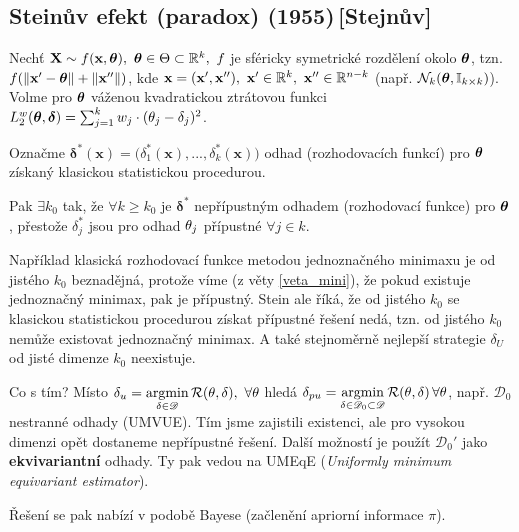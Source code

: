 \subsection{Steinův efekt (paradox) (1955)\,[Stejnův]}
Nechť $\textbf{X}\sim f(\textbf{x},\boldsymbol{\theta}),~\boldsymbol{\theta}\in\Theta\subset\mathbb{R}^k,~f$ je sféricky symetrické rozdělení okolo $\boldsymbol{\theta}$, tzn. $f(\left\|\textbf{x}'-\boldsymbol{\theta}\right\|+\left\|\textbf{x}''\right\|)$, kde $\textbf{x}=(\textbf{x}',\textbf{x}''),~\textbf{x}'\in\mathbb{R}^k,~\textbf{x}''\in\mathbb{R}^{n-k}$ (např. $\mathcal{N}_k(\boldsymbol{\theta},\mathbb{I}_{k\times k})$). Volme pro $\boldsymbol{\theta}$ váženou kvadratickou ztrátovou funkci $L_2^w(\boldsymbol{\theta},\boldsymbol{\delta})=\sum_{j=1}^k w_j\cdot(\theta_j-\delta_j)^2$. 
	
Označme $\boldsymbol{\delta}^\ast(\textbf{x})=\big(\delta_1^\ast(\textbf{x}),...,\delta_k^\ast(\textbf{x})\big)$ odhad (rozhodovacích funkcí) pro $\boldsymbol{\theta}$ získaný klasickou statistickou procedurou. 

Pak $\exists k_0$ tak, že $\forall k\geq k_0$ je $\boldsymbol{\delta}^\ast$ nepřípustným odhadem (rozhodovací funkce) pro $\boldsymbol{\theta}$, přestože $\delta_j^\ast$ jsou pro odhad $\theta_j$ přípustné $\forall j\in\widehat{k}$.
\begin{dusl}
	Například klasická rozhodovací funkce metodou jednoznačného minimaxu je od jistého $k_0$ beznadějná, protože víme (z věty \ref{veta_mini}), že pokud existuje jednoznačný minimax, pak je přípustný. Stein ale říká, že od jistého $k_0$ se klasickou statistickou procedurou získat přípustné řešení nedá, tzn. od jistého $k_0$ nemůže existovat jednoznačný minimax. A také stejnoměrně nejlepší strategie $\delta_U$ od jisté dimenze $k_0$ neexistuje.
\end{dusl}
Co s tím? Místo $\delta_u=\mathop{\mathrm{argmin}}\limits_{\delta\in\mathscr{D}}\mathcal{R}(\theta,\delta),~\forall\theta$ hledá $\delta_{pu}=\mathop{\mathrm{argmin}}\limits_{\delta\in\mathscr{D}_0\subset\mathscr{D}}\mathcal{R}(\theta,\delta)\,\forall\theta$, např. $\mathscr{D}_0$ nestranné odhady (UMVUE). Tím jsme zajistili existenci, ale pro vysokou dimenzi opět dostaneme nepřípustné řešení. Další možností je použít $\mathscr{D}_0'$ jako \textbf{ekvivariantní} odhady. Ty pak vedou na UMEqE (\textit{Uniformly minimum equivariant estimator}).  

Řešení se pak nabízí v podobě Bayese (začlenění apriorní informace $\pi$).

